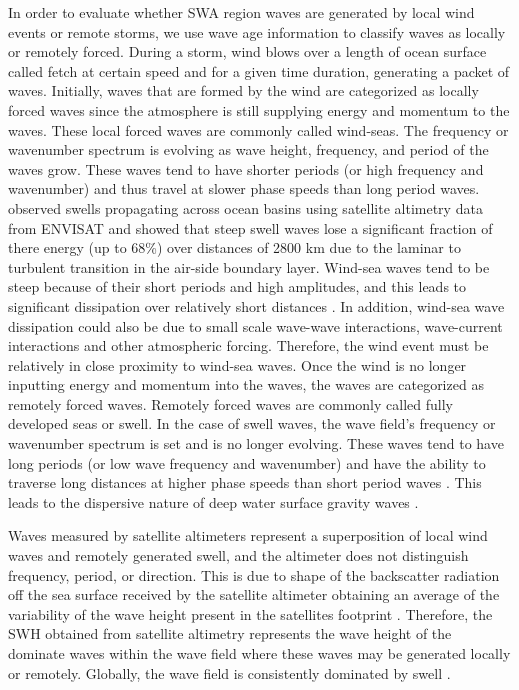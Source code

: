 \documentclass[12pt,twoside]{article}
\begin{document}
In order to evaluate whether SWA region waves are generated by local wind events or remote storms, we use wave age information to classify waves as locally or remotely forced. During a storm, wind blows over a length of ocean surface called fetch at certain speed and for a given time duration, generating a packet of waves. Initially, waves that are formed by the wind are categorized as locally forced waves since the atmosphere is still supplying energy and momentum to the waves. These local forced waves are commonly called wind-seas. The frequency or wavenumber spectrum is evolving as wave height, frequency, and period of the waves grow. These waves tend to have shorter periods (or high frequency and wavenumber) and thus travel at slower phase speeds than long period waves. \citet{ardhuin2009observation} observed swells propagating across ocean basins using satellite altimetry data from ENVISAT and showed that steep swell waves lose a significant fraction of there energy (up to 68\%) over distances of 2800 km due to the laminar to turbulent transition in the air-side boundary layer. Wind-sea waves tend to be steep because of their short periods and high amplitudes, and this leads to significant dissipation over relatively short distances \cite{ardhuin2009observation}. In addition, wind-sea wave dissipation could also be due to small scale wave-wave interactions, wave-current interactions and other atmospheric forcing. Therefore, the wind event must be relatively in close proximity to wind-sea waves. Once the wind is no longer inputting energy and momentum into the waves, the waves are categorized as remotely forced waves. Remotely forced waves are commonly called fully developed seas or swell. In the case of swell waves, the wave field's frequency or wavenumber spectrum is set and is no longer evolving. These waves tend to have long periods (or low wave frequency and wavenumber) and have the ability to traverse long distances at higher phase speeds than short period waves \cite{snodgrass1966propagation}. This leads to the dispersive nature of deep water surface gravity waves \cite{snodgrass1966propagation}.   

Waves measured by satellite altimeters represent a superposition of local wind waves and remotely generated swell, and the altimeter does not distinguish frequency, period, or direction. This is due to shape of the backscatter radiation off the sea surface received by the satellite altimeter obtaining an average of the variability of the wave height present in the satellites footprint \cite{chelton2001satellite}. Therefore, the SWH obtained from satellite altimetry represents the wave height of the dominate waves within the wave field where these waves may be generated locally or remotely. Globally, the wave field is consistently dominated by swell \cite{chen2002global,semedo2011global}.
\end{document}
